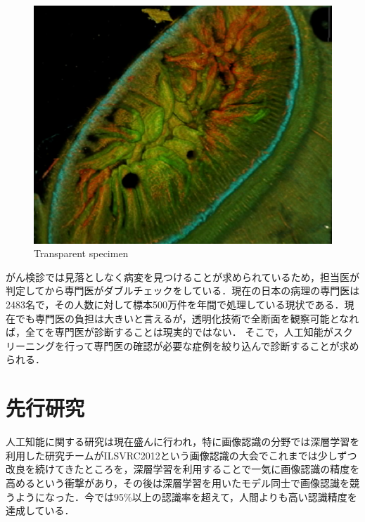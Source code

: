 \begin{figure}[H]
\begin{minipage}{0.4\columnwidth}
	\end{minipage}
	\begin{minipage}{0.4\columnwidth}
		\centering
		\includegraphics[clip, width=\linewidth]{fig/chapter1/colon_microscope}
	\end{minipage}
	\caption{Transparent specimen}
	\label{fig:lucid}
\end{figure}

がん検診では見落としなく病変を見つけることが求められているため，担当医が判定してから専門医がダブルチェックをしている．現在の日本の病理の専門医は2483名\cite{pathology}で，その人数に対して標本500万件を年間で処理している現状である．現在でも専門医の負担は大きいと言えるが，透明化技術で全断面を観察可能となれば，全てを専門医が診断することは現実的ではない．
そこで，人工知能がスクリーニングを行って専門医の確認が必要な症例を絞り込んで診断することが求められる．

\section{先行研究}
人工知能に関する研究は現在盛んに行われ，特に画像認識の分野では深層学習\cite{lecun2015deep}を利用した研究チームがILSVRC2012という画像認識の大会でこれまでは少しずつ改良を続けてきたところを，深層学習を利用することで一気に画像認識の精度を高めるという衝撃があり，その後は深層学習を用いたモデル同士で画像認識を競うようになった．今では95\%以上の認識率を超えて，人間よりも高い認識精度を達成している．

